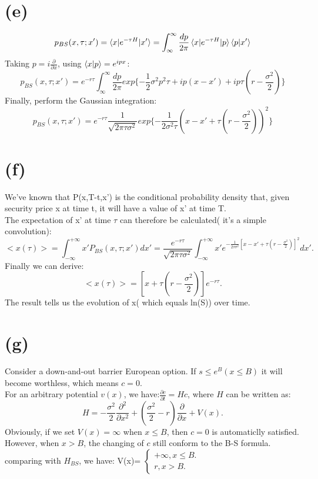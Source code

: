 \documentclass[12pt,a4paper]{paper}
\begin{document}
\section{(e)}
\begin{equation}
p_{BS}(x, \tau; x') = \braket{x|e^{-\tau H}|x'} = \int_{\infty}^{\infty} \frac{dp}{2\pi}\braket{x|e^{-\tau H}|p}\braket{p|x'}
\end{equation}
Taking $p = i \frac{\partial}{\partial x}$, using $\braket{x|p} = e^{ipx}$:
\begin{equation}
p_{BS}(x, \tau;x') = e^{-r\tau}\int_{\infty}^{\infty}\frac{dp}{2\pi}exp\{- \frac{1}{2}\sigma^2p^2\tau + ip(x - x') + ip\tau(r - \frac{\sigma^2}{2}) \}
\end{equation}
Finally, perform the Gaussian integration:
\begin{equation}
p_{BS}(x, \tau;x') = e^{-r\tau} \frac{1}{\sqrt{2\pi \tau \sigma^2}} exp\{ - \frac{1}{2 \sigma^2 \tau}(x - x' + \tau(r - \frac{\sigma^2}{2}) )^2 \}
\end{equation}

\section{(f)}
We've known that P(x,T-t,x') is the conditional probability density that, given security price x at time t, it will have a value of x' at time T.\\
\indent The expectation of x' at time $\tau$ can therefore be calculated( it's a simple convolution):
\begin{equation}
<x(\tau)>=\int_{-\infty }^{+\infty }x'P_{BS}(x,\tau;x')dx'=\frac{e^{-r\tau}}{\sqrt{2\pi \tau \sigma ^2}}\int_{-\infty }^{+\infty }x'e^{-\frac{1}{2\tau \sigma ^2}[x-x'+\tau(r-\frac{\sigma ^2}{2})]^2}dx'.
\end{equation}
\indent Finally we can derive:
\begin{equation}
<x(\tau)>=[x+\tau(r-\frac{\sigma ^2}{2})]e^{-r\tau}.
\end{equation}
The result tells us the evolution of x( which equals ln(S)) over time.

\section{(g)}
\indent Consider a down-and-out barrier European option. If $s\leq e^B(x\leq B)$ it will become worthless, which means $c=0$. \\
\indent For an arbitrary potential $v(x)$, we have:$\frac{\partial c}{\partial t}=Hc$, where $H$ can be written as:
\begin{equation}
H=-\frac{\sigma ^2}{2}\frac{\partial^2 }{\partial x^2}+(\frac{\sigma^2}{2} -r)\frac{\partial }{\partial x}+V(x).
\end{equation}
\indent Obviously, if we set $V(x)=\infty$ when $x\leq B$, then $c=0$ is automaticlly satisfied. However, when $x>B$, the changing of $c$ still conform to the B-S formula. comparing with $H_{BS}$, we have:
V(x)=
$\left\{\begin{matrix}
+\infty,x\leq B.\\
r,x>B.
\end{matrix}\right.$
\end{document}
